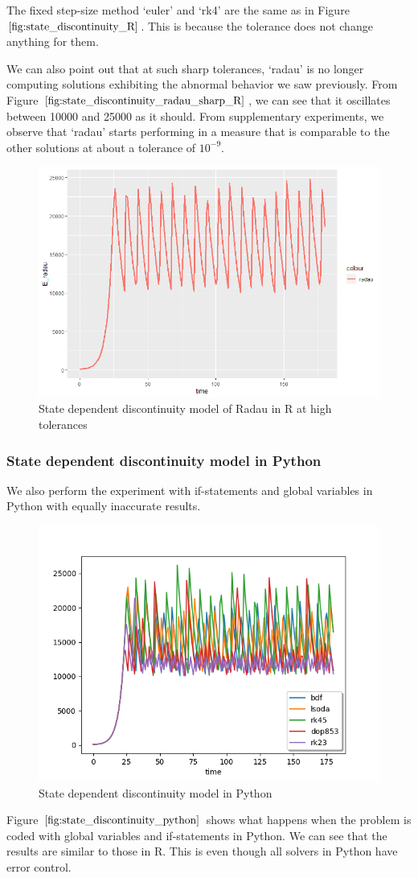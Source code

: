 The fixed step-size method `euler' and `rk4' are the same as in Figure $\ref{fig:state_discontinuity_R}$. This is because the tolerance does not change anything for them.

We can also point out that at such sharp tolerances, `radau' is no longer computing solutions exhibiting the abnormal behavior we saw previously. From Figure $\ref{fig:state_discontinuity_radau_sharp_R}$, we can see that it oscillates between 10000 and 25000 as it should. From supplementary experiments, we observe that `radau' starts performing in a measure that is comparable to the other solutions at about a tolerance of $10^{-9}$.

\begin{figure}[h]
\centering
\includegraphics[width=0.7\linewidth]{./figures/state_discontinuity_sharp_radau_R}
\caption{State dependent discontinuity model of Radau in R at high tolerances}
\label{fig:state_discontinuity_radau_sharp_R}
\end{figure}

\subsubsection{State dependent discontinuity model in Python}
We also perform the experiment with if-statements and global variables in Python with equally inaccurate results.

\begin{figure}[h]
\centering
\includegraphics[width=0.7\linewidth]{./figures/state_discontinuity_py}
\caption{State dependent discontinuity model in Python}
\label{fig:state_discontinuity_python}
\end{figure}
Figure $\ref{fig:state_discontinuity_python}$ shows what happens when the problem is coded with global variables and if-statements in Python. We can see that the results are similar to those in R. This is even though all solvers in Python have error control.

